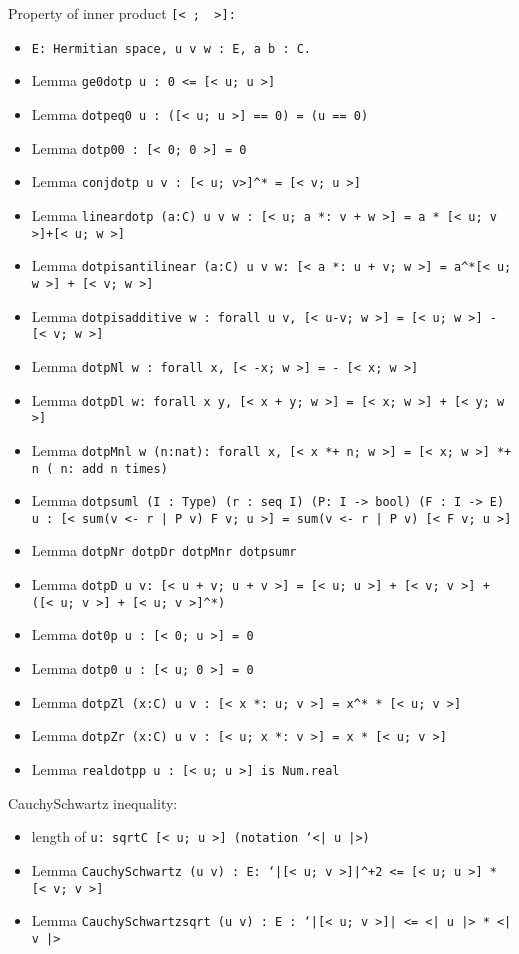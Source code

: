 \noindent Property of inner product \tt{[< \tus; \tus\ >]}: 
\begin{itemize}
\item \tt{E}: Hermitian space, \tt{u v w : E, a b : C}.
\item Lemma \tt{ge0\us dotp u : 0 <= [< u; u >]}
\item Lemma \tt{dotp\us eq0 u : ([< u; u >] == 0) = (u == 0)}
\item Lemma \tt{dotp00 : [< 0; 0 >] = 0}
\item Lemma \tt{conj\us dotp u v : [< u; v>]\^{}* = [< v; u >]}
\item Lemma \tt{linear\us dotp (a:C) u v w : [< u; a *: v + w >] = a * [< u; v >]+[< u; w >]}
\item Lemma \tt{dotp\us is\us antilinear (a:C) u v w: [< a *: u + v; w >] = a\^{}*[< u; w >] + [< v; w >]}
\item Lemma \tt{dotp\us is\us additive w : forall u v, [< u-v; w >] = [< u; w >] - [< v; w >]}
\item Lemma \tt{dotpNl w : forall x, [< -x; w >] = - [< x; w >]}
\item Lemma \tt{dotpDl w: forall x y, [< x + y; w >] = [< x; w >] + [< y; w >]}
\item Lemma \tt{dotpMnl w (n:nat): forall x, [< x *+ n; w >] = [< x; w >] *+ n} (\text{*+} n: add n times)
\item Lemma \tt{dotp\us suml (I : Type) (r : seq I) (P: I -> bool) (F : I -> E) u :	 
[< \bs sum\us(v <- r | P v) F v; u >] = \bs sum\us(v <- r | P v) [< F v; u >]}
\item Lemma \tt{dotpNr dotpDr dotpMnr dotp\us sumr}
\item Lemma \tt{dotpD u v: [< u + v; u + v >] = [< u; u >] + [< v; v >] + ([< u; v >] + [< u; v >]\^{}*)}
\item Lemma \tt{dot0p u : [< 0; u >] = 0}
\item Lemma \tt{dotp0 u : [< u; 0 >] = 0}
\item Lemma \tt{dotpZl (x:C) u v : [< x *: u; v >] = x\^{}* * [< u; v >]}
\item Lemma \tt{dotpZr (x:C) u v : [< u; x *: v >] = x * [< u; v >]}
\item Lemma \tt{real\us dotpp u : [< u; u >] \bs is Num.real }
\end{itemize}

\noindent CauchySchwartz inequality:
\begin{itemize}
\item length of \tt{u: \bs sqrtC [< u; u >]} (notation \tt{`<| u |>})
\item Lemma \tt{CauchySchwartz (u v) : E: `|[< u; v >]|\^{}+2 <= [< u; u >] * [< v; v >]}
\item Lemma \tt{CauchySchwartz\us sqrt (u v) : E : `|[< u; v >]| <= <| u |> * <| v |>}
\end{itemize}


